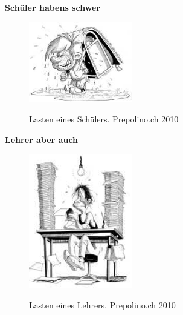 
\begin{center}
	\textbf{Schüler haben\grq s schwer}
\end{center}

\begin{figure}[h]
	\centering
		\includegraphics[width=0.4\textwidth]{images/Lasten-eines-Schuelers.jpg}\\
	\caption{Lasten eines Schülers. Prepolino.ch 2010}
	\label{fig:Lasten-eines-Schuelers}
\end{figure}

\begin{center}
	\textbf{Lehrer aber auch}
\end{center}

\begin{figure}[h]
	\centering
		\includegraphics[width=0.4\textwidth]{images/Lasten-eines-Lehrers.jpg}\\
	\caption{Lasten eines Lehrers. Prepolino.ch 2010}
	\label{fig:Lasten-eines-Lehrers}
\end{figure}





